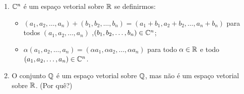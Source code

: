 \begin{exemplo}
\begin{enumerate}[label={\arabic*})]
    \item $\mathbb{C}^n$ é um espaço vetorial sobre $\mathbb{R}$ se definirmos:
          \begin{itemize}
            \item $(a_1, a_2, \dots, a_n) + (b_1, b_2, \dots,b_n) = (a_1 + b_1, a_2 + b_2,\dots, a_n + b_n)$ para todos $(a_1, a_2, \dots,a_n)$ ,$(b_1, b_2, \dots,b_n) \in \mathbb{C}^n$;
            \item $\alpha (a_1, a_2, \dots,a_n) = (\alpha a_1, \alpha a_2, \dots, \alpha a_n)$ para todo $\alpha \in \mathbb{R}$ e todo $(a_1, a_2, \dots, a_n) \in \mathbb{C}^n$.
          \end{itemize}

    \item O conjunto $\mathbb{Q}$ é um espaço vetorial sobre $\mathbb{Q}$, mas não é um espaço vetorial sobre $\mathbb{R}$. (Por quê?)


\end{enumerate}
\end{exemplo}
